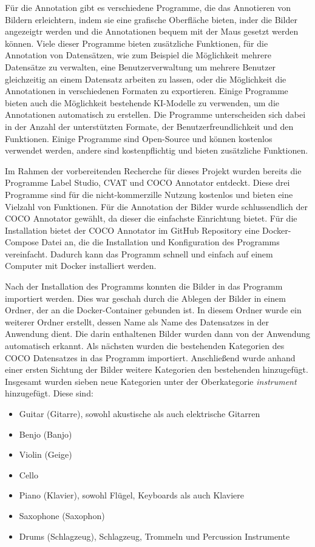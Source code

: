 Für die Annotation gibt es verschiedene Programme, die das Annotieren von Bildern erleichtern, indem sie eine grafische Oberfläche bieten, inder die Bilder angezeigtr werden und die Annotationen bequem mit der Maus gesetzt werden können.
Viele dieser Programme bieten zusätzliche Funktionen, für die Annotation von Datensätzen, wie zum Beispiel die Möglichkeit mehrere Datensätze zu verwalten, eine Benutzerverwaltung um mehrere Benutzer gleichzeitig an einem Datensatz arbeiten zu lassen, oder die Möglichkeit die Annotationen in verschiedenen Formaten zu exportieren. Einige Programme bieten auch die Möglichkeit bestehende KI-Modelle zu verwenden, um die Annotationen automatisch zu erstellen.
Die Programme unterscheiden sich dabei in der Anzahl der unterstützten Formate, der Benutzerfreundlichkeit und den Funktionen. Einige Programme sind Open-Source und können kostenlos verwendet werden, andere sind kostenpflichtig und bieten zusätzliche Funktionen.

Im Rahmen der vorbereitenden Recherche für dieses Projekt wurden bereits die Programme Label Studio, CVAT und COCO Annotator entdeckt. Diese drei Programme sind für die nicht-kommerzille Nutzung kostenlos und bieten eine Vielzahl von Funktionen.
Für die Annotation der Bilder wurde schlussendlich der COCO Annotator gewählt, da dieser die einfachste Einrichtung bietet. Für die Installation bietet der COCO Annotator im GitHub Repository eine Docker-Compose Datei an, die die Installation und Konfiguration des Programms vereinfacht. Dadurch kann das Programm schnell und einfach auf einem Computer mit Docker installiert werden.

Nach der Installation des Programms konnten die Bilder in das Programm importiert werden. Dies war geschah durch die Ablegen der Bilder in einem Ordner, der an die Docker-Container gebunden ist. In diesem Ordner wurde ein weiterer Ordner erstellt, dessen Name als Name des Datensatzes in der Anwendung dient. Die darin enthaltenen Bilder wurden dann von der Anwendung automatisch erkannt.
Als nächsten wurden die bestehenden Kategorien des COCO Datensatzes in das Programm importiert. Anschließend wurde anhand einer ersten Sichtung der Bilder weitere Kategorien den bestehenden hinzugefügt.
Insgesamt wurden sieben neue Kategorien unter der Oberkategorie \emph{instrument} hinzugefügt. Diese sind:
\begin{itemize}
    \item Guitar (Gitarre), sowohl akustische als auch elektrische Gitarren
    \item Benjo (Banjo)
    \item Violin (Geige)
    \item Cello
    \item Piano (Klavier), sowohl Flügel, Keyboards als auch Klaviere
    \item Saxophone (Saxophon)
    \item Drums (Schlagzeug), Schlagzeug, Trommeln und Percussion Instrumente
\end{itemize}

